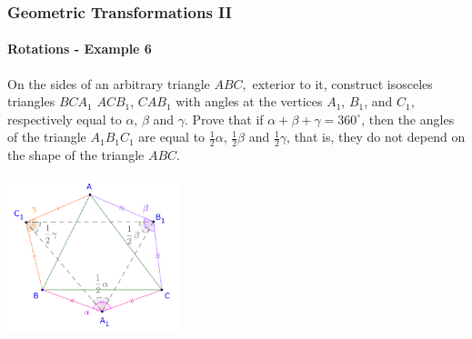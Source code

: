 \documentclass[8pt,xcolor=table,dvipsnames]{beamer}
\providecommand{\half}{\frac{1}{2}}
\newcommand{\dg}{^\circ}
\begin{document}
\begin{frame}[t]
    \frametitle{Geometric Transformations II}
    \framesubtitle{Rotations - Example 6}
    \begin{example}
        On the sides of an arbitrary triangle $ABC,$ exterior to it, construct isosceles triangles $BCA_1$ $ACB_1$, $CAB_1$
        with angles at the vertices $A_1$, $B_1$, and $C_1$, respectively equal to $\alpha$, $\beta$ and $\gamma$.
        \bigbreak
        Prove that if $\alpha + \beta + \gamma = 360\dg$, then the angles of the triangle $A_1B_1C_1$
        are equal to $\half\alpha$, $\half\beta$ and $\half\gamma$, that is, they do not depend on the shape of the triangle $ABC.$
    \end{example}

    \begin{center}
        \includegraphics[width=5cm]{./svg/pdf/rotation-6a.pdf}
    \end{center}
\end{frame}
\end{document}
